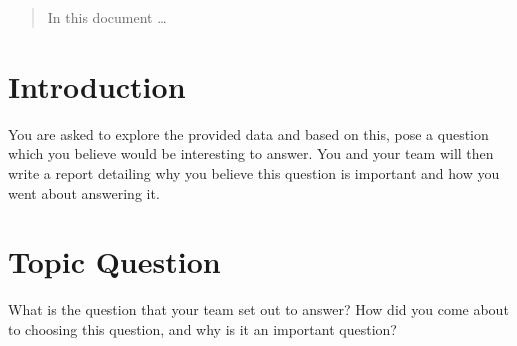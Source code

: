 \documentclass[12pt]{article}
\begin{document}
\maketitle

\begin{abstract}

In this document \ldots
\end{abstract}

\section{Introduction}
You are asked to explore the
provided data and based on this, pose a question which you believe would be interesting to
answer. You and your team will then write a report detailing why you believe this question is
important and how you went about answering it.

\section{Topic Question}
\label{sec:topicQ}
What is the question that your team set out to answer? How did you
come about to choosing this question, and why is it an important question?









\end{document}
